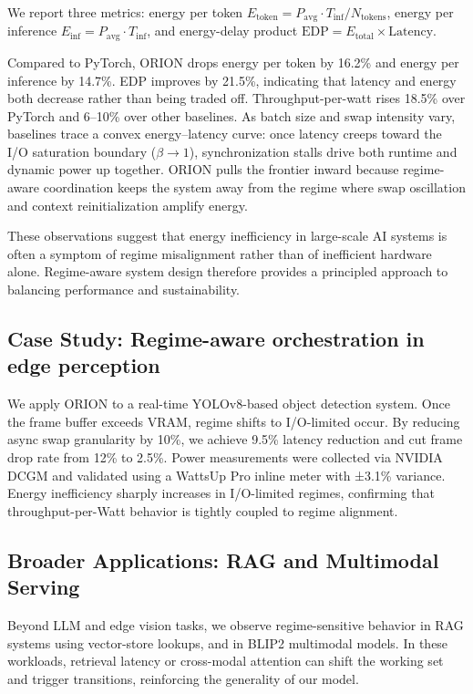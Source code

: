 We report three metrics: energy per token $E_{\mathrm{token}} = P_{\mathrm{avg}} \cdot T_{\mathrm{inf}} / N_{\mathrm{tokens}}$, energy per inference $E_{\mathrm{inf}} = P_{\mathrm{avg}} \cdot T_{\mathrm{inf}}$, and energy-delay product $\mathrm{EDP} = E_{\mathrm{total}} \times \mathrm{Latency}$.

Compared to PyTorch, ORION drops energy per token by 16.2\% and energy per inference by 14.7\%. EDP improves by 21.5\%, indicating that latency and energy both decrease rather than being traded off. Throughput-per-watt rises 18.5\% over PyTorch and 6--10\% over other baselines. As batch size and swap intensity vary, baselines trace a convex energy--latency curve: once latency creeps toward the I/O saturation boundary ($\beta \to 1$), synchronization stalls drive both runtime and dynamic power up together. ORION pulls the frontier inward because regime-aware coordination keeps the system away from the regime where swap oscillation and context reinitialization amplify energy.

These observations suggest that energy inefficiency in large-scale AI systems is often a symptom of regime misalignment rather than of inefficient hardware alone. Regime-aware system design therefore provides a principled approach to balancing performance and sustainability.
\vspace{2pt}

\subsection{Case Study: Regime-aware orchestration in edge perception}
We apply ORION to a real-time YOLOv8-based object detection system. Once the frame buffer exceeds VRAM, regime shifts to I/O-limited occur. By reducing async swap granularity by 10\%, we achieve 9.5\% latency reduction and cut frame drop rate from 12\% to 2.5\%.
Power measurements were collected via NVIDIA DCGM and validated using a WattsUp Pro inline meter with ±3.1\% variance. Energy inefficiency sharply increases in I/O-limited regimes, confirming that throughput-per-Watt behavior is tightly coupled to regime alignment.

\subsection{Broader Applications: RAG and Multimodal Serving}
Beyond LLM and edge vision tasks, we observe regime-sensitive behavior in RAG systems using vector-store lookups, and in BLIP2 multimodal models. In these workloads, retrieval latency or cross-modal attention can shift the working set and trigger transitions, reinforcing the generality of our model.

